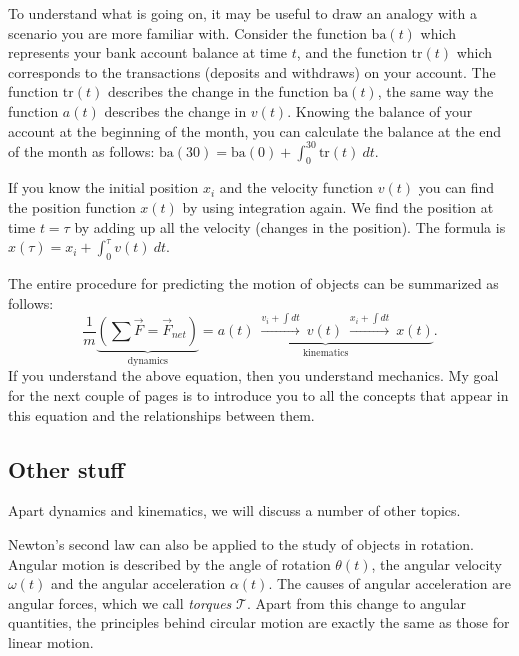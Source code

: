 \documentclass[letterpaper,9pt,journal]{IEEEtran}
\def\mcal{\mathcal}
\begin{document}
To understand what is going on, it may be useful to draw an analogy with a scenario you are more familiar with.
Consider the function $\textrm{ba}(t)$ which represents your bank account balance at time $t$,
and the function $\textrm{tr}(t)$ which corresponds to the transactions (deposits and withdraws) on your account.
The function $\textrm{tr}(t)$ describes the change in the function $\textrm{ba}(t)$,
the same way the function $a(t)$ describes the change in $v(t)$.
Knowing the balance of your account at the beginning of the month,
you can calculate the balance at the end of the month as follows: $\textrm{ba}(30)=\textrm{ba}(0)+\int_0^{30} \textrm{tr}(t)\:dt$.

If you know the initial position $x_i$ and the velocity function $v(t)$ you can find the position function $x(t)$ by using integration again.  
We find the position at time $t=\tau$ by adding up all the velocity (changes in the position). 
The formula is $x(\tau) = x_i + \int_0^\tau v(t)\:dt$.


The entire procedure for predicting the motion of objects can be summarized as follows:
\begin{equation}
\frac{1}{m} \underbrace{ \left( \sum \vec{F} = \vec{F}_{net}  \right) }_{\text{dynamics}} = \underbrace{ a(t) \ \overset{v_i+ \int\!dt }{\longrightarrow} \ v(t) \ \overset{x_i+ \int\!dt }{\longrightarrow} \ x(t) }_{\text{kinematics}}.
 \label{fma-eqn}
\end{equation}
%
If you understand the above equation, then you understand mechanics.
My goal for the next couple of pages is to introduce you to all the concepts that 
appear in this equation and the relationships between them. 




\vspace{-3mm}
\subsection{Other stuff}

Apart dynamics and kinematics, we will discuss a number of other topics.

Newton's second law can also be applied to the study of objects in rotation.
Angular motion is described by the angle of rotation $\theta(t)$, 
the angular velocity $\omega(t)$ and the angular acceleration $\alpha(t)$.
The causes of angular acceleration are angular forces, which we call \emph{torques} $\mcal{T}$.
Apart from this change to angular quantities, the principles behind circular motion 
are exactly the same as those for linear motion.
\end{document}
